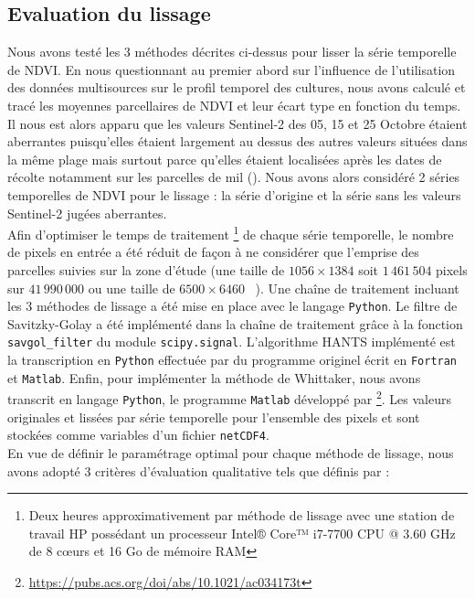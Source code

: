 \subsection{Evaluation du lissage}

Nous avons testé les 3 méthodes décrites ci-dessus pour lisser la série temporelle de NDVI. En nous questionnant au premier abord sur l'influence de l'utilisation des données multisources sur le profil temporel des cultures, nous avons calculé et tracé les moyennes parcellaires de NDVI et leur écart type en fonction du temps. Il nous est alors apparu que les valeurs Sentinel-2 des 05, 15 et 25 Octobre étaient aberrantes puisqu'elles étaient largement au dessus des autres valeurs situées dans la même plage mais surtout parce qu'elles étaient localisées après les dates de récolte notamment sur les parcelles de mil (). Nous avons alors considéré 2 séries temporelles de NDVI pour le lissage : la série d'origine et la série sans les valeurs Sentinel-2 jugées aberrantes. 
\\Afin d'optimiser le temps de traitement \footnote{Deux heures approximativement par méthode de lissage avec une station de travail HP possédant un processeur Intel® Core™ i7-7700 CPU @ 3.60 GHz de 8 c\oe urs et 16 Go de mémoire RAM} de chaque série temporelle, le nombre de pixels en entrée a été réduit de façon à ne considérer que l'emprise des parcelles suivies sur la zone d'étude (une taille de $1056\times1384$ soit $1\,461\,504$ pixels sur $41\,990\,000$ ou une taille de $6500\times6460$ ~). Une chaîne de traitement incluant les 3 méthodes de lissage a été mise en place avec le langage \texttt{Python}. Le filtre de Savitzky-Golay a été implémenté dans la chaîne de traitement grâce à la fonction \texttt{savgol\_filter} du module \texttt{scipy.signal}. L'algorithme HANTS implémenté est la transcription en \texttt{Python} effectuée par \citet{Espinoza-Davalos2017} du programme originel écrit en \texttt{Fortran} et \texttt{Matlab}. Enfin, pour implémenter la méthode de Whittaker, nous avons transcrit en langage \texttt{Python}, le programme \texttt{Matlab} développé par \citet{Eilers2003} \footnote{\url{https://pubs.acs.org/doi/abs/10.1021/ac034173t}}. Les valeurs originales et lissées par série temporelle pour l'ensemble des pixels et  sont stockées comme variables d'un fichier \texttt{netCDF4}. 
\\En vue de définir le paramétrage optimal pour chaque méthode de lissage, nous avons adopté 3 critères d'évaluation qualitative tels que définis par \citet{Klisch2006} : 
